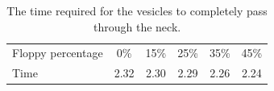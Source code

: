 \documentclass[twoside,twocolumn,9pt]{article}
\begin{document}
\begin{table}[h]
  \centering
  \begin{tabular}{l|ccccc}
    \hline
    Floppy percentage & 0\% & 15\% & 25\% & 35\% & 45\% \\ 
    Time  & 2.32 & 2.30 & 2.29 & 2.26 & 2.24 \\
    \hline
  \end{tabular}
  \caption{\label{tbl:contractingTimes} \small The time required for the
  vesicles to completely pass through the neck.}
\end{table}
\end{document}
